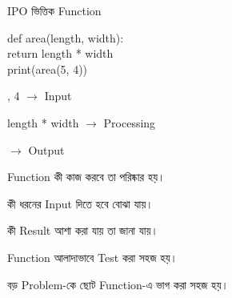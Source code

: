 \begin{codeoutputbox}{IPO ভিত্তিক Function}

\noindent
\begin{minipage}[t]{0.54\linewidth}
\codeheading

\begin{english}
\ttfamily
def area(length, width):\\
\hspace*{4mm}return length * width\\[0.5mm]
print(area(5, 4))
\end{english}

\end{minipage}
\hfill
\begin{minipage}[t]{0.42\linewidth}
\outputheading

\begin{center}
\textenglish{}
\end{center}

\textenglish{, 4}
\(\longrightarrow\)
Input

\medskip

\textenglish{\ttfamily length * width}
\(\longrightarrow\)
Processing

\medskip

\textenglish{}
\(\longrightarrow\)
Output

\end{minipage}

\end{codeoutputbox}



\begin{compacttwocolpoints}

\item Function কী কাজ করবে তা পরিষ্কার হয়।

\item কী ধরনের Input দিতে হবে বোঝা যায়।

\item কী Result আশা করা যায় তা জানা যায়।

\item Function আলাদাভাবে Test করা সহজ হয়।

\item বড় Problem-কে ছোট Function-এ ভাগ করা সহজ হয়।

\end{compacttwocolpoints}

